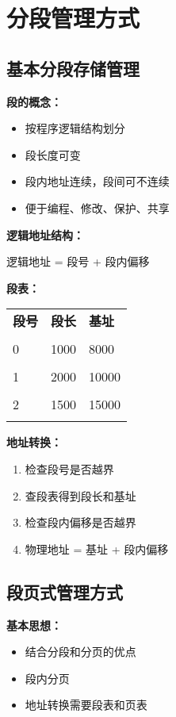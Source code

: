 \documentclass[lang=cn,newtx,10pt,scheme=chinese]{../../elegantbook}
\begin{document}
\section{分段管理方式}

\subsection{基本分段存储管理}

\textbf{段的概念：}
\begin{itemize}
  \item 按程序逻辑结构划分
  \item 段长度可变
  \item 段内地址连续，段间可不连续
  \item 便于编程、修改、保护、共享
\end{itemize}

\textbf{逻辑地址结构：}
\begin{center}
逻辑地址 = 段号 + 段内偏移
\end{center}

\textbf{段表：}
\begin{longtable}{@{}p{3cm}p{3cm}p{3cm}@{}}
\toprule
\textbf{段号} & \textbf{段长} & \textbf{基址} \\\\ \midrule
\endhead

0 & 1000 & 8000 \\\\
1 & 2000 & 10000 \\\\
2 & 1500 & 15000 \\\\

\bottomrule
\end{longtable}

\textbf{地址转换：}
\begin{enumerate}
  \item 检查段号是否越界
  \item 查段表得到段长和基址
  \item 检查段内偏移是否越界
  \item 物理地址 = 基址 + 段内偏移
\end{enumerate}

\subsection{段页式管理方式}

\textbf{基本思想：}
\begin{itemize}
  \item 结合分段和分页的优点
  \item 段内分页
  \item 地址转换需要段表和页表
\end{itemize}
\end{document}
